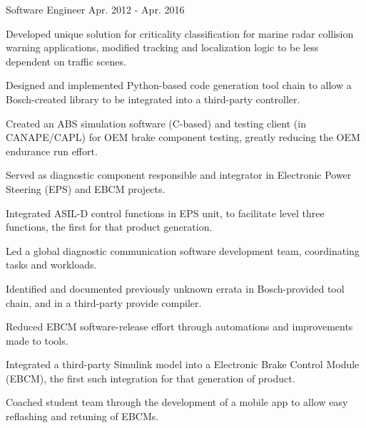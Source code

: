 \begin{cventries}
  \cventry
    {Software Engineer} %
    {} %
    {} %
    {Apr. 2012 - Apr. 2016} %
    {
      \begin{cvitems} %
        \item {Developed unique solution for criticality classification for marine radar collision warning applications, modified tracking and localization logic to be less dependent on traffic scenes.}
        \item {Designed and implemented Python-based code generation tool chain to allow a Bosch-created library to be integrated into a third-party controller.}
        \item {Created an ABS simulation software (C-based) and testing client (in CANAPE/CAPL) for OEM brake component testing, greatly reducing the OEM endurance run effort.}
        \item {Served as diagnostic component responsible and integrator in Electronic Power Steering (EPS) and EBCM projects.}
        \item {Integrated ASIL-D control functions in EPS unit, to facilitate level three functions, the first for that product generation.}
        \item {Led a global diagnostic communication software development team, coordinating tasks and workloads.}
        \iflongform     
        \item {Identified and documented previously unknown errata in Bosch-provided tool chain, and in a third-party provide compiler.}
        \item {Reduced EBCM software-release effort through automations and improvements made to tools.}
        \item {Integrated a third-party Simulink model into a Electronic Brake Control Module (EBCM), the first such integration for that generation of product.}
        \item {Coached student team through the development of a mobile app to allow easy reflashing and retuning of EBCMs.}
        \fi
      \end{cvitems}
    }
\end{cventries}
